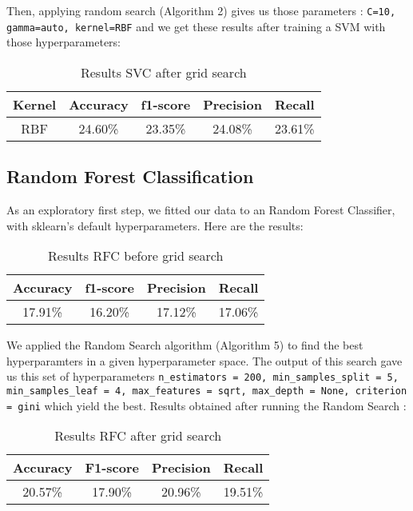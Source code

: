 \documentclass[twocolumn]{article}
\begin{document}
Then, applying random search (Algorithm 2) gives us those parameters : \texttt{C=10, gamma=auto, kernel=RBF} and we get these results after training a SVM with those hyperparameters:


\begin{table}[h]
    \centering
    \begin{tabular}{|c|c|c|c|c|}
    \hline
      Kernel & Accuracy & f1-score & Precision & Recall \\
      \hline
      RBF & 24.60\% & 23.35\% & 24.08\% & 23.61\% \\
    \hline
    \end{tabular}

    \label{tab:my_label}
    \caption{Results SVC after grid search}
\end{table}

\subsection{Random Forest Classification}
\label{5.4}
As an exploratory first step, we fitted our data to an Random Forest Classifier, with sklearn's default hyperparameters. Here are the results:

\begin{table}[h]
    \centering
    \begin{tabular}{|c|c|c|c|}
    \hline
      Accuracy & f1-score & Precision & Recall \\
      \hline
      17.91\% & 16.20\% & 17.12\% & 17.06\% \\
    \hline
    \end{tabular}

    \label{tab:my_label}
    \caption{Results RFC before grid search}
\end{table}

We applied the Random Search algorithm (Algorithm 5) to find the best hyperparamters in a given hyperparameter space. The output of this search gave us this set of hyperparameters \texttt{n\_estimators = 200, min\_samples\_split = 5, min\_samples\_leaf = 4, max\_features = sqrt, max\_depth = None, criterion = gini} which yield the best. Results obtained after running the Random Search : 

\begin{table}[!h]
    \centering
    \begin{tabular}{|c|c|c|c|}
        \hline
         Accuracy & F1-score & Precision & Recall\\
        \hline
         20.57\% & 17.90\% & 20.96\% & 19.51\%\\
        \hline
    \end{tabular}
    
    \label{tab:my_label}
    \caption{Results RFC after grid search}
\end{table}
\end{document}
